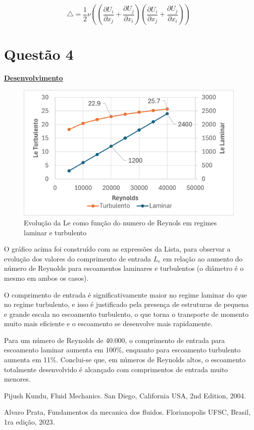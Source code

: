 \documentclass[12pt]{article}
\begin{document}
\begin{equation}
	\bigtriangleup = \frac{1}{2} \nu\left( \left( \frac{\partial U_i}{\partial x_j} + \frac{\partial U_j}{\partial x_i}\right)  \left( \frac{\partial U_i}{\partial x_j} + \frac{\partial U_j}{\partial x_i}\right)  \right) 
\end{equation}


\section*{Questão 4}

\textbf{\underline{Desenvolvimento}}

\begin{figure}[H]
	\centering
	\includegraphics[width=.65\textwidth]{figures/4}
	\caption{Evolução da Le como função do numero de Reynols em regimes laminar e turbulento}
\end{figure}

O gráfico acima foi construído com as expressões da Lista, para observar a evolução dos valores do comprimento de entrada $L_e$ em relação ao aumento do número de Reynolds para escoamentos laminares e turbulentos (o diâmetro é o mesmo em ambos os casos). 

O comprimento de entrada é significativamente maior no regime laminar do que no regime turbulento, e isso é justificado pela presença de estruturas de pequena e grande escala no escoamento turbulento, o que torna o transporte de momento muito mais eficiente e o escoamento se desenvolve mais rapidamente.

Para um número de Reynolds de 40.000, o comprimento de entrada para escoamento laminar aumenta em 100\%, enquanto para escoamento turbulento aumenta em 11\%. Conclui-se que, em números de Reynolds altos, o escoamento totalmente desenvolvido é alcançado com comprimentos de entrada muito menores.

\begin{thebibliography}{999}
	
	
	Pijush Kundu,
	Fluid Mechanics.
	San Diego, California USA,
	2nd Edition,
	2004.
	
	Alvaro Prata,
	Fundamentos da mecanica dos fluidos.
	Florianopolis UFSC, Brasil,
	1ra edição,
	2023.
	
	
\end{thebibliography}
\end{document}
